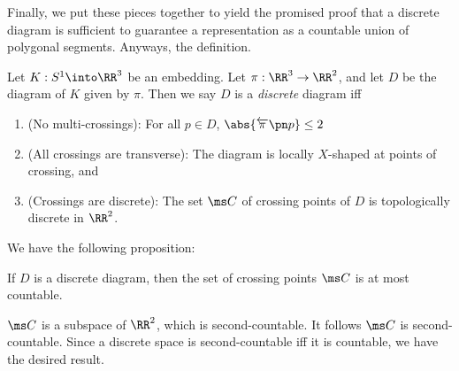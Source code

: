 Finally, we put these pieces together to yield the promised proof that
a discrete diagram is sufficient to guarantee a representation as a
countable union of polygonal segments. Anyways, the definition.

\begin{definition}
  Let $K : S^1 \into \RR^3$ be an embedding. Let $\pi : \RR^3 \to
  \RR^2$, and let $D$ be the diagram of $K$ given by $\pi$. Then we
  say $D$ is a \emph{discrete} diagram iff
  \begin{enumerate}
    \item (No multi-crossings): For all $p \in D$,
      $\abs{\fpre{\pi}{p}} \leq 2$
    \item (All crossings are transverse): The diagram is locally
      $X$-shaped at points of crossing, and
    \item (Crossings are discrete): The set $\ms C$ of crossing points
      of $D$ is topologically discrete in $\RR^2$. \qedhere
  \end{enumerate}
\end{definition}
We have the following proposition:
\begin{proposition}\label{prop:at-most-countable-crossings}
  If $D$ is a discrete diagram, then the set of crossing points $\ms
  C$ is at most countable.
\end{proposition}
\begin{sproof}
  $\ms C$ is a subspace of $\RR^2$, which is second-countable. It
  follows $\ms C$ is second-countable. Since a discrete space is
  second-countable iff it is countable, we have the desired result.
\end{sproof}

